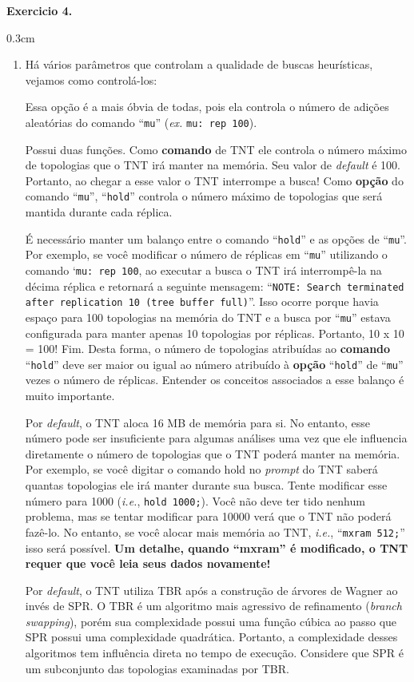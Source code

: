 \begin{refsection}
\begin{blackBlock}{\textbf{Exercicio 4.}}
\begin {myindentpar}{0.3cm}
\begin{enumerate}[\itshape i.]
\item{Há vários parâmetros que controlam a qualidade de buscas heurísticas, vejamos como controlá-los:}

 Essa opção é a mais óbvia de todas, pois ela controla o número de adições aleatórias do comando ``\texttt{mu}'' (\textit{ex.} \texttt{mu: rep 100}).

 Possui duas funções. Como \textbf{comando} de TNT ele controla o número máximo de topologias que o TNT irá manter na memória. Seu valor de \textit{default} é 100. Portanto, ao chegar a esse valor o TNT interrompe a busca! Como \textbf{opção} do comando ``\texttt{mu}'', ``\texttt{hold}'' controla o número máximo de topologias que será mantida durante cada réplica.

É necessário manter um balanço entre o comando ``\texttt{hold}'' e as opções de ``\texttt{mu}''. Por exemplo, se você modificar o número de réplicas em ``\texttt{mu}'' utilizando o comando `\texttt{mu: rep 100}, ao executar a busca o TNT irá interrompê-la na décima réplica e retornará a seguinte mensagem: ``\texttt{NOTE: Search terminated after replication 10 (tree buffer full)}''. Isso ocorre porque havia espaço para 100 topologias na memória do TNT e a busca por ``\texttt{mu}'' estava configurada para manter apenas 10 topologias por réplicas. Portanto, 10 x 10 = 100! Fim. Desta forma, o número de topologias atribuídas ao \textbf{comando} ``\texttt{hold}'' deve ser maior ou igual ao número atribuído à \textbf{opção} ``\texttt{hold}'' de ``\texttt{mu}'' vezes o número de réplicas. Entender os conceitos associados a esse balanço é muito importante.

 Por \textit{default}, o TNT aloca 16 MB de memória para si. No entanto, esse número pode ser insuficiente para algumas análises uma vez que ele influencia diretamente o número de topologias que o TNT poderá manter na memória. Por exemplo, se você digitar o comando hold no \textit{prompt} do TNT saberá quantas topologias ele irá manter durante sua busca. Tente modificar esse número para 1000 (\textit{i.e.}, \texttt{hold 1000;}). Você não deve ter tido nenhum problema, mas se tentar modificar para 10000 verá que o TNT não poderá fazê-lo. No entanto, se você alocar mais memória ao TNT, \textit{i.e.}, ``\texttt{mxram 512;}'' isso será possível. \textbf{Um detalhe, quando ``mxram'' é modificado, o TNT requer que você leia seus dados novamente!}

 Por \textit{default}, o TNT utiliza TBR após a construção de árvores de Wagner ao invés de SPR. O TBR é um algoritmo mais agressivo de refinamento (\textit{branch swapping}), porém sua complexidade possui uma função cúbica ao passo que SPR possui uma complexidade quadrática. Portanto, a complexidade desses algoritmos tem influência direta no tempo de execução. Considere que SPR é um subconjunto das topologias examinadas por TBR.


\end{enumerate}
\end{myindentpar}
\end{blackBlock}
\end{refsection}

